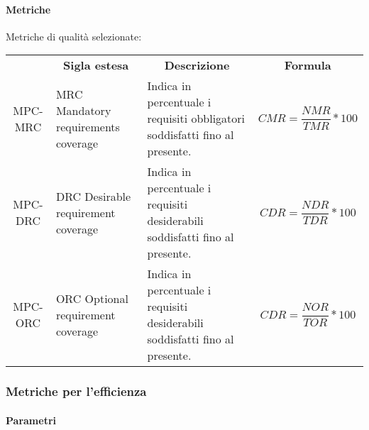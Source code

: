 \paragraph{Metriche}
Metriche di qualità selezionate:
\begin{table}[H]
    \centering
    \renewcommand{\arraystretch}{1.8}
    \begin{tabular}{| c | p{4.2cm} | p{5cm} | p{2cm} |  }
        \rowcolor[HTML]{a52a2a}
        \multicolumn{1}{c}{\color[HTML]{FFFFFF} \textbf{Codice}}       &
        \multicolumn{1}{c}{\color[HTML]{FFFFFF} \textbf{Sigla estesa}} &
        \multicolumn{1}{c}{\color[HTML]{FFFFFF} \textbf{Descrizione}}  &
        \multicolumn{1}{c}{\color[HTML]{FFFFFF} \textbf{Formula}}                                                                                                                                                                                     \\
        MPC-MRC                                                        & MRC Mandatory requirements coverage & Indica in percentuale i requisiti obbligatori soddisfatti fino al presente.  & \begin{equation} CMR=\frac{NMR}{TMR}*100 \end{equation} \\
        MPC-DRC                                                        & DRC Desirable requirement coverage  & Indica in percentuale i requisiti desiderabili soddisfatti fino al presente. & \begin{equation} CDR=\frac{NDR}{TDR}*100 \end{equation} \\
        MPC-ORC                                                        & ORC Optional requirement coverage   & Indica in percentuale i requisiti desiderabili soddisfatti fino al presente. & \begin{equation} CDR=\frac{NOR}{TOR}*100 \end{equation} \\
        \hline
    \end{tabular}
\end{table}
\subsubsection{Metriche per l'efficienza }

\paragraph{Parametri}
